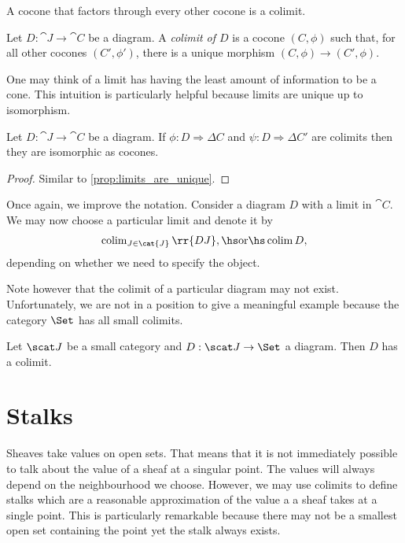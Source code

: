 \documentclass{article}
\begin{document}
A cocone that factors through every other cocone is a colimit.

\begin{definition}
  Let $D:\cat{J}\to\cat{C}$ be a diagram. A \emph{colimit of $D$} is a cocone
  $(C,\phi)$ such that, for all other cocones $(C',\phi')$, there is a unique morphism
  $(C,\phi)\to(C',\phi)$.
\end{definition}

One may think of a limit has having the least amount of information to be a cone.
This intuition is particularly helpful because limits are unique up to isomorphism.

\begin{proposition}
  Let $D:\cat{J}\to\cat{C}$ be a diagram. If $\phi:D\Rightarrow\Delta C$
  and $\psi:D\Rightarrow\Delta C'$ are colimits then they are isomorphic as cocones.
  \begin{proof}
    Similar to \ref{prop:limits_are_unique}.
  \end{proof}
\end{proposition}

\begin{notation}
  Once again, we improve the notation. Consider a diagram
  $D$ with a limit in $\cat{C}$. We may now choose a particular limit and denote
  it by
  \begin{align*}
    \colim_{J\in\cat{J}}\rr{DJ},\hs\text{or}\hs\colim D,
  \end{align*}
  depending on whether we need to specify the object.
\end{notation}

Note however that the colimit of a particular diagram may not exist. Unfortunately, we
are not in a position to give a meaningful example because the category $\Set$ has
all small colimits.

\begin{theorem}
  Let $\scat J$ be a small category and $D:\scat J\to\Set$ a diagram. Then $D$ has a colimit.
\end{theorem}

\section{Stalks}

Sheaves take values on open sets. That means that it is not immediately
possible to talk about the value of a sheaf at a singular point. The
values will always depend on the neighbourhood we choose. However,
we may use colimits to define stalks which are a reasonable approximation
of the value a a sheaf takes at a single point. This is particularly
remarkable because there may not be a smallest open set containing
the point yet the stalk always exists.
\end{document}
